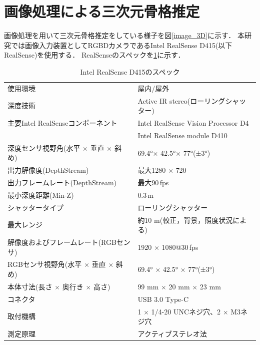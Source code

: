 \documentclass[a4j, fleqn, 12pt]{jsreport}
\begin{document}
\section{画像処理による三次元骨格推定}\label{3Dskeleton}
画像処理を用いて三次元骨格推定をしている様子を図\ref{image_3D}に示す．
本研究では画像入力装置としてRGBDカメラであるIntel RealSense D415(以下RealSense)を使用する．
RealSenseのスペックを\ref{D415}に示す．
\begin{table}[t]
  \centering
  \caption{Intel RealSense D415のスペック}
  \begin{tabular}{l|l}
    \hline
    {\small 使用環境}                                  & {\small 屋内/屋外}                                     \\
    {\small 深度技術}                                  & {\small Active IR stereo(ローリングシャッター)}              \\
    {\small 主要Intel RealSenseコンポーネント}              & {\small Intel RealSense Vision Processor D4}       \\
                                                   & {\small Intel RealSense module D410}               \\
    {\small 深度センサ視野角(水平 $\times$ 垂直 $\times$ 斜め)}  & {\small 69.4°$\times$ 42.5°$\times$ 77°(±3°)}      \\
    {\small 出力解像度(DepthStream)}                    & {\small 最大1280 $\times$ 720}                       \\
    {\small 出力フレームレート(DepthStream) }               & {\small 最大90\,fps}                                 \\
    {\small 最小深度距離(Min-Z)}                         & {\small 0.3\,m}                                    \\
    {\small シャッタータイプ}                              & {\small ローリングシャッター}                                \\
    {\small 最大レンジ}                                 & {\small 約10 m(較正，背景，照度状況による)}                      \\
    {\small 解像度およびフレームレート(RGBセンサ)}                 & {\small 1920 $\times$ 1080@30\,fps }               \\
    {\small RGBセンサ視野角(水平 $\times$ 垂直 $\times$ 斜め)} & {\small 69.4° $\times$ 42.5° $\times$ 77°(±3°)}    \\
    {\small 本体寸法(長さ $\times$ 奥行き $\times$ 高さ)}     & {\small 99 mm $\times$ 20 mm $\times$ 23 mm}       \\
    {\small コネクタ}                                  & {\small USB 3.0 Type-C}                            \\
    {\small 取付機構}                                  & {\small 1 $\times$ 1/4-20 UNCネジ穴、2 $\times$ M3ネジ穴} \\
    {\small 測定原理}                                  & {\small アクティブステレオ法}                                \\\hline
  \end{tabular}
  \label{D415}
\end{table}
\end{document}
